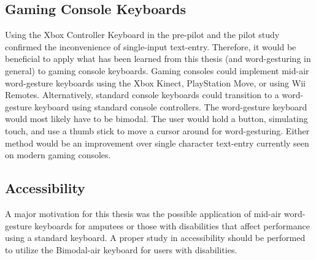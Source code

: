 \subsection{Gaming Console Keyboards} \label{future_gaming_keyboard}
Using the Xbox Controller Keyboard in the pre-pilot and the pilot study confirmed the inconvenience of single-input text-entry. Therefore, it would be beneficial to apply what has been learned from this thesis (and word-gesturing in general) to gaming console keyboards. Gaming consoles could implement mid-air word-gesture keyboards using the Xbox Kinect, PlayStation Move, or using Wii Remotes. Alternatively, standard console keyboards could transition to a word-gesture keyboard using standard console controllers. The word-gesture keyboard would most likely have to be bimodal. The user would hold a button, simulating touch, and use a thumb stick to move a cursor around for word-gesturing. Either method would be an improvement over single character text-entry currently seen on modern gaming consoles.

\subsection{Accessibility}
A major motivation for this thesis was the possible application of mid-air word-gesture keyboards for amputees or those with disabilities that affect performance using a standard keyboard. A proper study in accessibility should be performed to utilize the Bimodal-air keyboard for users with disabilities.

